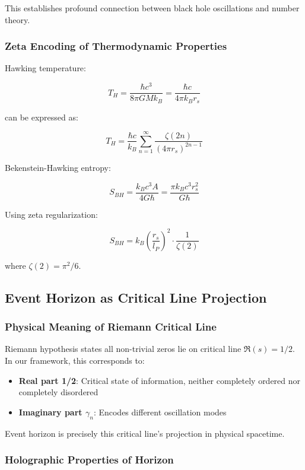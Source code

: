 \documentclass[12pt,a4paper]{article}
\begin{document}
This establishes profound connection between black hole oscillations and number theory.

\subsubsection{Zeta Encoding of Thermodynamic Properties}

Hawking temperature:

$$T_H = \frac{\hbar c^3}{8\pi GMk_B} = \frac{\hbar c}{4\pi k_B r_s}$$

can be expressed as:

$$T_H = \frac{\hbar c}{k_B} \sum_{n=1}^{\infty} \frac{\zeta(2n)}{(4\pi r_s)^{2n-1}}$$

Bekenstein-Hawking entropy:

$$S_{BH} = \frac{k_B c^3 A}{4G\hbar} = \frac{\pi k_B c^3 r_s^2}{G\hbar}$$

Using zeta regularization:

$$S_{BH} = k_B \left(\frac{r_s}{l_P}\right)^2 \cdot \frac{1}{\zeta(2)}$$

where $\zeta(2) = \pi^2/6$.

\subsection{Event Horizon as Critical Line Projection}

\subsubsection{Physical Meaning of Riemann Critical Line}

Riemann hypothesis states all non-trivial zeros lie on critical line $\Re(s) = 1/2$. In our framework, this corresponds to:

\begin{itemize}
\item \textbf{Real part 1/2}: Critical state of information, neither completely ordered nor completely disordered
\item \textbf{Imaginary part $\gamma_n$}: Encodes different oscillation modes
\end{itemize}

Event horizon is precisely this critical line's projection in physical spacetime.

\subsubsection{Holographic Properties of Horizon}
\end{document}
